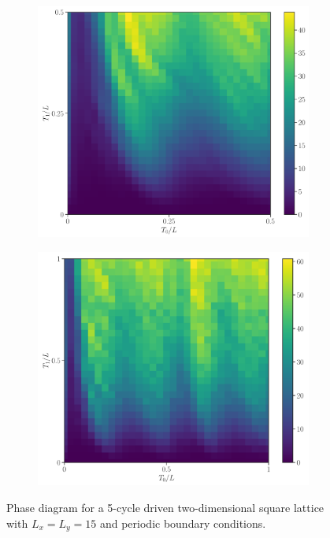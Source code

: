 \documentclass[11pt, a4paper, oneside]{book}
\theoremstyle{definition} %
\begin{document}
\begin{figure}[h]
\centering
\begin{subfigure}[t]{0.49\textwidth}
	\centering
	\includegraphics[width =\textwidth]{PhaseDiagram2D}
\end{subfigure}
\begin{subfigure}[t]{0.49\textwidth}
	\centering
	\includegraphics[width =\textwidth]{PhaseDiagram2D-2}
\end{subfigure}
\caption{Phase diagram for a 5-cycle driven two-dimensional square lattice with $L_x = L_y =15$ and periodic boundary conditions.}
\label{Phase-structure2d}
\end{figure}
\end{document}
